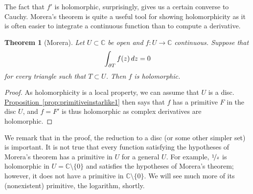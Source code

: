 \documentclass[12pt,openany]{book}
\newcommand{\avoidbreak}{\postdisplaypenalty=100}
\newcommand{\C}{{\mathbb{C}}}
\theoremstyle{plain}
\newtheorem{thm}{Theorem}[section]
\theoremstyle{remark}
\theoremstyle{definition}
\theoremstyle{exercise}
\theoremstyle{example}
\newcommand{\propref}[1]{\hyperref[#1]{Proposition~\ref*{#1}}}
\begin{document}
The fact that $f'$ is holomorphic, surprisingly, gives us a
certain converse to Cauchy.
Morera's theorem is quite a useful tool for showing
holomorphicity as it is often easier to integrate a continuous
function than to compute a derivative.

\begin{thm}[Morera]
%
\label{thm:Morera}%
Let $U \subset \C$ be open and $f \colon U \to \C$ continuous.
Suppose that
\begin{equation*}
\int_{\partial T} f(z) \, dz = 0
\avoidbreak
\end{equation*}
for every triangle such that $T \subset U$.  Then $f$ is holomorphic.
\end{thm}

\begin{proof}
As holomorphicity is a local property, we can assume that $U$ is a disc.
\propref{prop:primitiveinstarlike1} then says that $f$ has
a primitive $F$ in the disc $U$, and $f = F'$ is thus holomorphic
as complex derivatives are holomorphic.
\end{proof}

We remark that in the proof,
the reduction to a disc (or some other simpler set)
is important.  It is not true
that every function satisfying the hypotheses of Morera's theorem has a
primitive in $U$ for a general $U$.  For example, $\nicefrac{1}{z}$ is
holomorphic in $U = \C \setminus \{ 0 \}$ and satisfies the hypotheses of
Morera's theorem; however, it does not have a primitive
in $\C \setminus \{ 0 \}$.  We will see much
more of its (nonexistent) primitive, the logarithm, shortly.
\end{document}
